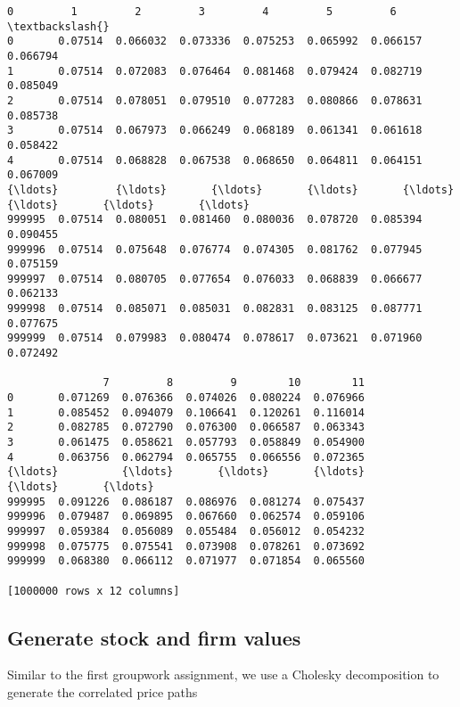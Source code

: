 \documentclass[11pt]{article}
\makeatletter
\newcommand{\boxspacing}{\kern\kvtcb@left@rule\kern\kvtcb@boxsep}
\newcommand{\prompt}[4]{
        \ttfamily\llap{{\color{#2}[#3]:\hspace{3pt}#4}}\vspace{-\baselineskip}
    }
\makeatother
\begin{document}
            \begin{tcolorbox}[breakable, size=fbox, boxrule=.5pt, pad at break*=1mm, opacityfill=0]
\prompt{Out}{outcolor}{18}{\boxspacing}
\begin{Verbatim}[commandchars=\\\{\}]
              0         1         2         3         4         5         6  \textbackslash{}
0       0.07514  0.066032  0.073336  0.075253  0.065992  0.066157  0.066794
1       0.07514  0.072083  0.076464  0.081468  0.079424  0.082719  0.085049
2       0.07514  0.078051  0.079510  0.077283  0.080866  0.078631  0.085738
3       0.07514  0.067973  0.066249  0.068189  0.061341  0.061618  0.058422
4       0.07514  0.068828  0.067538  0.068650  0.064811  0.064151  0.067009
{\ldots}         {\ldots}       {\ldots}       {\ldots}       {\ldots}       {\ldots}       {\ldots}       {\ldots}
999995  0.07514  0.080051  0.081460  0.080036  0.078720  0.085394  0.090455
999996  0.07514  0.075648  0.076774  0.074305  0.081762  0.077945  0.075159
999997  0.07514  0.080705  0.077654  0.076033  0.068839  0.066677  0.062133
999998  0.07514  0.085071  0.085031  0.082831  0.083125  0.087771  0.077675
999999  0.07514  0.079983  0.080474  0.078617  0.073621  0.071960  0.072492

               7         8         9        10        11
0       0.071269  0.076366  0.074026  0.080224  0.076966
1       0.085452  0.094079  0.106641  0.120261  0.116014
2       0.082785  0.072790  0.076300  0.066587  0.063343
3       0.061475  0.058621  0.057793  0.058849  0.054900
4       0.063756  0.062794  0.065755  0.066556  0.072365
{\ldots}          {\ldots}       {\ldots}       {\ldots}       {\ldots}       {\ldots}
999995  0.091226  0.086187  0.086976  0.081274  0.075437
999996  0.079487  0.069895  0.067660  0.062574  0.059106
999997  0.059384  0.056089  0.055484  0.056012  0.054232
999998  0.075775  0.075541  0.073908  0.078261  0.073692
999999  0.068380  0.066112  0.071977  0.071854  0.065560

[1000000 rows x 12 columns]
\end{Verbatim}
\end{tcolorbox}
        
\subsection{Generate stock and firm values
}

    Similar to the first groupwork assignment, we use a Cholesky
decomposition to generate the correlated price paths
\end{document}
